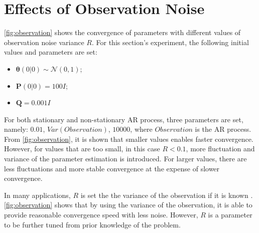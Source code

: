 \documentclass{article}
\begin{document}
\section{Effects of Observation Noise}

\cref{fig:observation} shows the convergence of parameters with different values of observation noise variance $R$. For this section's experiment, the following initial values and parameters are set:
\begin{itemize}
    \item $\bm{\theta}(0|0) \sim \mathcal{N}(0, 1)$;
    \item $\bm{P}(0|0) = 100I$;
    \item $\bm{Q} = 0.001I$
\end{itemize}

For both stationary and non-stationary AR process, three parameters are set, namely: $0.01$, $Var(Observation)$, $10000$, where $Observation$ is the AR process. From \cref{fig:observation}, it is shown that smaller values enables faster convergence. However, for values that are too small, in this case $R < 0.1$, more fluctuation and variance of the parameter estimation is introduced. For larger values, there are less fluctuations and more stable convergence at the expense of slower convergence.

In many applications, $R$ is set the the variance of the observation if it is known \cite[p.~265]{labbe2020}. \cref{fig:observation} shows that by using the variance of the observation, it is able to provide reasonable convergence speed with less noise. However, $R$ is a parameter to be further tuned from prior knowledge of the problem. 
\end{document}
